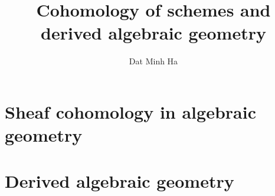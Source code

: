 

\setcounter{section}{-1}





	\title{Cohomology of schemes and derived algebraic geometry}
	
	\author{Dat Minh Ha}
	\maketitle
	
	\begin{abstract}
	    
	\end{abstract}
	
	{
      \hypersetup{} 
      \dominitoc
      \tableofcontents %
    }
    
    
    
    \chapter{Sheaf cohomology in algebraic geometry}
        \begin{abstract}
            
        \end{abstract}
        
        \minitoc
        
        
        
        
        
        
    
    \chapter{Derived algebraic geometry}
        \begin{abstract}
            
        \end{abstract}
        
        \minitoc
    
